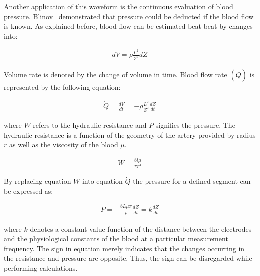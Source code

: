 Another application of this waveform is the continuous evaluation of blood pressure. Blinov~\cite{blinov1997plethysmographic} demonstrated that pressure could be deducted if the blood flow is known. As explained before, blood flow can be estimated beat-beat by changes into:

\begin{align}
	\label{eq:dvdr}
	dV = \rho \frac{L^2}{Z^2} dZ
\end{align}

Volume rate is denoted by the change of volume in time. Blood flow rate $(\dot{Q})$ is represented by the following equation:

\begin{align}
	\label{eq:Q}
	\dot{Q} = \frac{dV}{dt}=-\rho \frac{L^2}{Z^{2}} \frac{dZ}{dt}
\end{align}

where $W$ refers to the hydraulic resistance and $P$ signifies the pressure. The hydraulic resistance is a function of the geometry of the artery provided by radius $r$ as well as the viscosity of the blood $\mu$.

\begin{align}
	W=\frac{8 l \mu}{\pi r^4}
\end{align}

By replacing equation $W$ into equation $\dot{Q}$ the pressure for a defined segment can be expressed as:

\begin{align}
	P = -\frac{8 L \mu \pi}{\rho} \frac{dZ}{dt} = k \frac{dZ}{dt}
\end{align}

where $k$ denotes a constant value function of the distance between the electrodes and the physiological constants of the blood at a particular measurement frequency. The sign in equation merely indicates that the changes occurring in the resistance and pressure are opposite. Thus, the sign can be disregarded while performing calculations.


